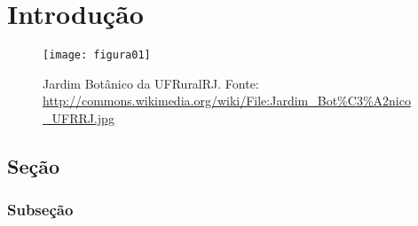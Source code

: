 \setcounter{page}{1}
\artigofalse
\chapter{Introdução}
\label{chap:introduction}

\blindtext[2]

\begin{figure}[!ht]
\centering
\texttt{[image: figura01]}
\caption{Jardim Botânico da UFRuralRJ. Fonte: \url{http://commons.wikimedia.org/wiki/File:Jardim_Bot\%C3\%A2nico_UFRRJ.jpg}}
\label{fig:jardim}
\end{figure}

\blindtext[1]

\section{Seção}

\blindtext[2]

\subsection{Subseção}

\blindtext[2]